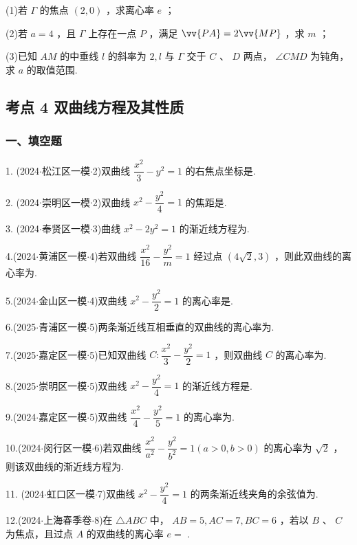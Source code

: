 (1)若 $\Gamma$ 的焦点 $\left( {2,0}\right)$ ，求离心率 $e$ ；

(2)若 $a = 4$ ，且 $\Gamma$ 上存在一点 $P$ ，满足 $\vv{PA} = 2\vv{MP}$ ，求 $m$ ；

(3)已知 ${AM}$ 的中垂线 $l$ 的斜率为 $2,l$ 与 $\Gamma$ 交于 $C$ 、 $D$ 两点， $\angle {CMD}$ 为钝角，求 $a$ 的取值范围.

\subsection*{考点 4 双曲线方程及其性质}

\subsubsection*{一、填空题}

1. (2024$\cdot$松江区一模$\cdot$2)双曲线 $\dfrac{{x}^{2}}{3} - {y}^{2} = 1$ 的右焦点坐标是\blkda[2]{}.

2. (2024$\cdot$崇明区一模$\cdot$2)双曲线 ${x}^{2} - \dfrac{{y}^{2}}{4} = 1$ 的焦距是\blkda[2]{}.

3. (2024$\cdot$奉贤区一模$\cdot$3)曲线 ${x}^{2} - 2{y}^{2} = 1$ 的渐近线方程为\blkda[2]{}.

4.(2024$\cdot$黄浦区一模$\cdot$4)若双曲线 $\dfrac{{x}^{2}}{16} - \dfrac{{y}^{2}}{m} = 1$ 经过点 $\left( {{4\sqrt{2}},3}\right)$ ，则此双曲线的离心率为\blkda[2]{}.

5.(2024$\cdot$金山区一模$\cdot$4)双曲线 ${x}^{2} - \dfrac{{y}^{2}}{2} = 1$ 的离心率是\blkda[2]{}.

6.(2025$\cdot$青浦区一模$\cdot$5)两条渐近线互相垂直的双曲线的离心率为\blkda[2]{}.

7.(2025$\cdot$嘉定区一模$\cdot$5)已知双曲线 $C : \dfrac{{x}^{2}}{3} - \dfrac{{y}^{2}}{2} = 1$ ，则双曲线 $C$ 的离心率为\blkda[2]{}.

8.(2025$\cdot$崇明区一模$\cdot$5)双曲线 ${x}^{2} - \dfrac{{y}^{2}}{4} = 1$ 的渐近线方程是\blkda[2]{}.

9.(2024$\cdot$嘉定区一模$\cdot$5)双曲线 $\dfrac{{x}^{2}}{4} - \dfrac{{y}^{2}}{5} = 1$ 的离心率为\blkda[2]{}.

10.(2024$\cdot$闵行区一模$\cdot$6)若双曲线 $\dfrac{{x}^{2}}{{a}^{2}} - \dfrac{{y}^{2}}{{b}^{2}} = 1\left( {a > 0,b > 0}\right)$ 的离心率为 $\sqrt{2}$ ，则该双曲线的渐近线方程为\blkda[2]{}.

11. (2024$\cdot$虹口区一模$\cdot$7)双曲线 ${x}^{2} - \dfrac{{y}^{2}}{4} = 1$ 的两条渐近线夹角的余弦值为\blkda[2]{}.

12.(2024$\cdot$上海春季卷$\cdot$8)在 $\bigtriangleup  {ABC}$ 中， ${AB} = 5,{AC} = 7,{BC} = 6$ ，若以 $B$ 、 $C$ 为焦点，且过点 $A$ 的双曲线的离心率 $e =$ \blkda[2]{}.

